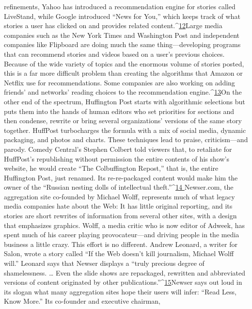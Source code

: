 refinements, Yahoo has introduced a recommendation engine for stories called
LiveStand, while Google introduced ``News for You,'' which keeps track of what
stories a user has clicked on and provides related content.^{\href{#endnotes-chapter-6}{12}}Large media companies
such as the New York Times and Washington Post and independent companies
like Flipboard are doing much the same thing—developing programs that
can recommend stories and videos based on a user's previous choices. Because of
the wide variety of topics and the enormous volume of stories posted, this is a far
more difficult problem than creating the algorithms that Amazon or Netflix use
for recommendations. Some companies are also working on adding friends' and
networks' reading choices to the recommendation engine.^{\href{#endnotes-chapter-6}{13}}On the other end of the spectrum, Huffington Post starts with algorithmic
selections but puts them into the hands of human editors who set priorities for
sections and then condense, rewrite or bring several organizations' versions of the
same story together. HuffPost turbocharges the formula with a mix of social media,
dynamic packaging, and photos and charts. These techniques lead to praise,
criticism—and parody. Comedy Central's Stephen Colbert told viewers that, to
retaliate for HuffPost's republishing without permission the entire contents of his
show's website, he would create ``The Colbuffington Repost,'' that is, the entire
Huffington Post, just renamed. Its re-re-packaged content would make him the
owner of the ``Russian nesting dolls of intellectual theft.''^{\href{#endnotes-chapter-6}{14
}}Newser.com, the aggregation site co-founded by Michael Wolff, represents
much of what legacy media companies hate about the Web: It has little original
reporting, and its stories are short rewrites of information from several other sites,
with a design that emphasizes graphics. Wolff, a media critic who is now editor of
Adweek, has spent much of his career playing provocateur—and driving people
in the media business a little crazy. This effort is no different. Andrew Leonard,
a writer for Salon, wrote a story called ``If the Web doesn't kill journalism, Michael
Wolff will.'' Leonard says that Newser displays a ``truly precious degree of
shamelessness. … Even the slide shows are repackaged, rewritten and abbreviated
versions of content originated by other publications.''^{\href{#endnotes-chapter-6}{15}}Newser says out loud in its slogan what many aggregation sites hope their users
will infer: ``Read Less, Know More.'' Its co-founder and executive chairman,
